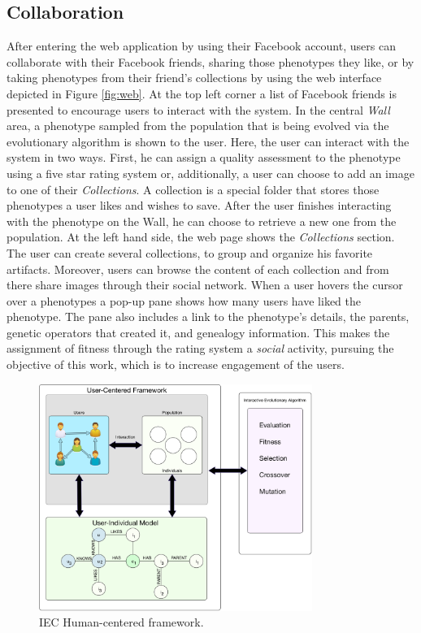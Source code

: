 \documentclass[conference]{IEEEtran}
\begin{document}
\subsection{Collaboration}
\label{sec:col}
After entering the web application by using their Facebook account,
users can collaborate with their Facebook friends, 
sharing those phenotypes they like, or by taking phenotypes
from their friend's collections by using the web interface depicted 
in Figure \ref{fig:web}.
At the top left corner a list of Facebook friends is presented
to encourage users to interact with the system. In the central 
\emph{ Wall } area, a phenotype sampled from the population that is
being evolved via the evolutionary algorithm 
is shown to the user.
Here, the user can interact with the system in two ways.
First, he can assign a quality assessment to the phenotype using
a five star rating system or,
additionally, a user can choose to add an image to one of their \emph{Collections}.
A collection is a special folder that stores those phenotypes a user likes and wishes
to save. After the user finishes interacting with the phenotype
on the Wall, he can choose to retrieve a new one from the population.
At the left hand side, the web page shows the \emph{Collections} section.
The user can create several collections, to group and organize his favorite 
artifacts. Moreover, users can browse the content of each collection and from
there share images through their social network.
When a user hovers the cursor over a phenotypes a pop-up pane shows how many users have
liked the phenotype. The pane also includes a link to the phenotype's 
details, the parents, genetic operators that created it, and genealogy
information. This makes the assignment of fitness through the rating
system a {\em social} activity, pursuing the objective of this work,
which is to increase engagement of the users.

\begin{figure}[!t]
    \centering
        \includegraphics[width=3.5in]{img/framework.png}
    \caption{IEC Human-centered framework.}
    \label{fig:uc_framework}
\end{figure}
\end{document}
